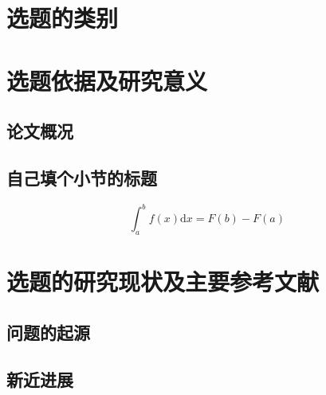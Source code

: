 \documentclass{proposal}
\newcommand{\dif}{\mathrm{d}}
\begin{document}
\begin{foundation}			%

\section{选题的类别}
\SectionEndLine				   %


\section{选题依据及研究意义}
\zhlipsum[2]
\subsection{论文概况}
\zhlipsum[1]

\subsection{自己填个小节的标题}
\zhlipsum[1]

$$\int^b_a f(x)\dif x = F(b) - F(a)$$

\SectionEndLine				   %


\section{选题的研究现状及主要参考文献}

\subsection{问题的起源}
\zhlipsum[1]

\subsection{新近进展}


\end{foundation}
\end{document}
